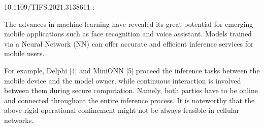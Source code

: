 \documentclass[../theses.tex]{subfiles}
\begin{document}
 10.1109/TIFS.2021.3138611 :
 
The advances in machine learning have revealed its
great potential for emerging mobile applications such as face
recognition and voice assistant. Models trained via a Neural
Network (NN) can offer accurate and efficient inference services for mobile users. 

For example, Delphi [4] and MiniONN [5] proceed the inference
tasks between the mobile device and the model owner, while
continuous interaction is involved between them during secure
computation. Namely, both parties have to be online and
connected throughout the entire inference process. It is noteworthy that the above rigid operational confinement might not
be always feasible in cellular networks. 
\end{document}
